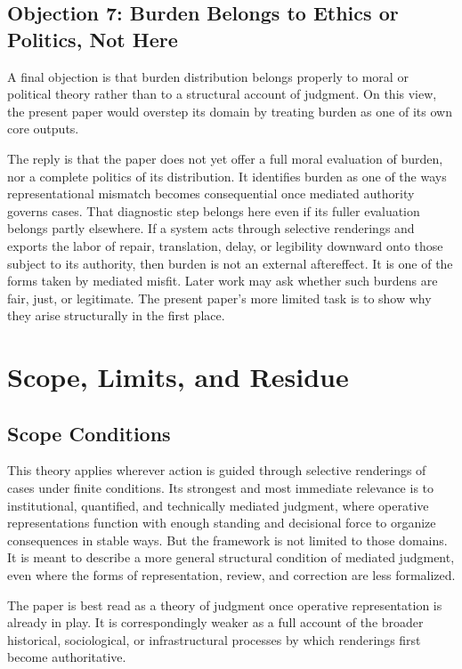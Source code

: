 \documentclass[11pt]{article}
\begin{document}
\subsection{Objection 7: Burden Belongs to Ethics or Politics, Not Here}

A final objection is that burden distribution belongs properly to moral or political theory rather than to a structural account of judgment. On this view, the present paper would overstep its domain by treating burden as one of its own core outputs.

The reply is that the paper does not yet offer a full moral evaluation of burden, nor a complete politics of its distribution. It identifies burden as one of the ways representational mismatch becomes consequential once mediated authority governs cases. That diagnostic step belongs here even if its fuller evaluation belongs partly elsewhere. If a system acts through selective renderings and exports the labor of repair, translation, delay, or legibility downward onto those subject to its authority, then burden is not an external aftereffect. It is one of the forms taken by mediated misfit. Later work may ask whether such burdens are fair, just, or legitimate. The present paper's more limited task is to show why they arise structurally in the first place.

\section{Scope, Limits, and Residue}

\subsection{Scope Conditions}

This theory applies wherever action is guided through selective renderings of cases under finite conditions. Its strongest and most immediate relevance is to institutional, quantified, and technically mediated judgment, where operative representations function with enough standing and decisional force to organize consequences in stable ways. But the framework is not limited to those domains. It is meant to describe a more general structural condition of mediated judgment, even where the forms of representation, review, and correction are less formalized.

The paper is best read as a theory of judgment once operative representation is already in play. It is correspondingly weaker as a full account of the broader historical, sociological, or infrastructural processes by which renderings first become authoritative.
\end{document}
